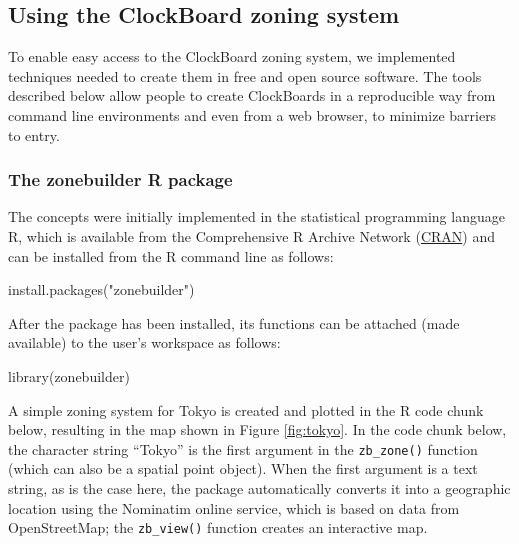 \documentclass{josis}
\newenvironment{Shaded}{\begin{snugshade}}{\end{snugshade}}
\newcommand{\FunctionTok}[1]{\textcolor[rgb]{0.00,0.00,0.00}{#1}}
\newcommand{\NormalTok}[1]{#1}
\newcommand{\StringTok}[1]{\textcolor[rgb]{0.31,0.60,0.02}{#1}}
\begin{document}
\hypertarget{using-the-clockboard-zoning-system}{%
\subsection{Using the ClockBoard zoning system}\label{using-the-clockboard-zoning-system}}

To enable easy access to the ClockBoard zoning system, we implemented techniques needed to create them in free and open source software.
The tools described below allow people to create ClockBoards in a reproducible way from command line environments and even from a web browser, to minimize barriers to entry.

\hypertarget{the-zonebuilder-r-package}{%
\subsubsection{The zonebuilder R package}\label{the-zonebuilder-r-package}}

The concepts were initially implemented in the statistical programming language R, which is available from the Comprehensive R Archive Network (\href{https://cran.r-project.org/package=zonebuilder}{CRAN}) and can be installed from the R command line as follows:

\begin{Shaded}
\begin{Highlighting}[]
\FunctionTok{install.packages}\NormalTok{(}\StringTok{"zonebuilder"}\NormalTok{)}
\end{Highlighting}
\end{Shaded}

After the package has been installed, its functions can be attached (made available) to the user's workspace as follows:

\begin{Shaded}
\begin{Highlighting}[]
\FunctionTok{library}\NormalTok{(zonebuilder)}
\end{Highlighting}
\end{Shaded}

A simple zoning system for Tokyo is created and plotted in the R code chunk below, resulting in the map shown in Figure \ref{fig:tokyo}.
In the code chunk below, the character string ``Tokyo'' is the first argument in the \texttt{zb\_zone()} function (which can also be a spatial point object).
When the first argument is a text string, as is the case here, the package automatically converts it into a geographic location using the Nominatim online service, which is based on data from OpenStreetMap; the \texttt{zb\_view()} function creates an interactive map.
\end{document}

